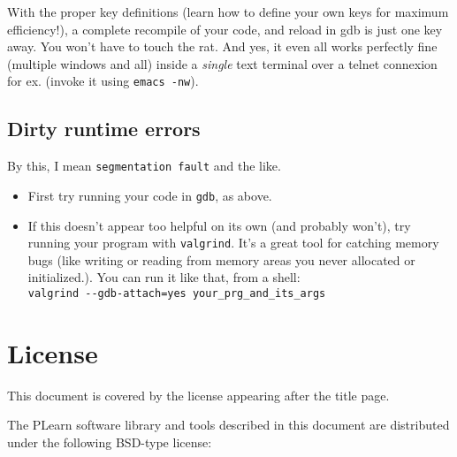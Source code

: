\documentclass[11pt]{book}
\begin{document}
With the proper key definitions (learn how to define your own keys for
maximum efficiency!), a complete recompile of your code, and reload in
gdb is just one key away.  You won't have to touch the rat. And yes,
it even all works perfectly fine (multiple windows and all) inside
a {\em single} text terminal over a telnet connexion for ex. (invoke
it using \verb!emacs -nw!).


\section{Dirty runtime errors}

By this, I mean {\tt segmentation fault} and the like.

\begin{itemize}
\item First try running your code in {\tt gdb}, as above.
\item If this doesn't appear too helpful on its own (and probably won't),
  try running your program with {\tt valgrind}. It's a great tool for
  catching memory bugs (like writing or reading from memory areas you never
  allocated or initialized.). You can run it like that, from a shell: \\
  \verb!valgrind --gdb-attach=yes your_prg_and_its_args!
\end{itemize}



\chapter*{License}

This document is covered by the license appearing after the title page.

The PLearn software library and tools described in this document are
distributed under the following BSD-type license:
\end{document}
